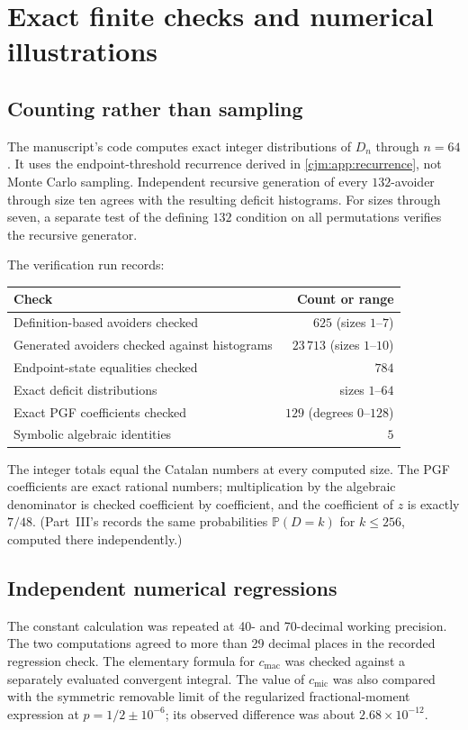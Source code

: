 \documentclass[11pt,a4paper]{article}
\theoremstyle{definition}\newaliascnt{definition}{theorem}
\theoremstyle{remark}\newaliascnt{remark}{theorem}
\newcommand{\ljP}{\mathbb P}
\newcommand{\cjmic}{c_{\mathrm{mic}}}
\newcommand{\cjmac}{c_{\mathrm{mac}}}
\begin{document}
\section{Exact finite checks and numerical illustrations}
\label{cjm:sec:computation}

\subsection{Counting rather than sampling}
The manuscript's code computes exact integer distributions of $D_n$ through
$n=64$. It uses the endpoint-threshold recurrence derived in
\cref{cjm:app:recurrence}, not Monte Carlo sampling. Independent recursive
generation of every $132$-avoider through size ten agrees with the resulting
deficit histograms. For sizes through seven, a separate test of the defining
$132$ condition on all permutations verifies the recursive generator.

The verification run records:
\begin{center}
\begin{tabular}{lr}
\toprule
Check & Count or range\\
\midrule
Definition-based avoiders checked & $625$ (sizes $1$--$7$)\\
Generated avoiders checked against histograms & $23\,713$ (sizes $1$--$10$)\\
Endpoint-state equalities checked & $784$\\
Exact deficit distributions & sizes $1$--$64$\\
Exact PGF coefficients checked & $129$ (degrees $0$--$128$)\\
Symbolic algebraic identities & $5$\\
\bottomrule
\end{tabular}
\end{center}
The integer totals equal the Catalan numbers at every computed size.
The PGF coefficients are exact rational numbers; multiplication by the
algebraic denominator is checked coefficient by coefficient, and the
coefficient of $z$ is exactly $7/48$. (Part~III's
 records the same
probabilities $\ljP(D=k)$ for $k\le256$, computed there independently.)

\subsection{Independent numerical regressions}
The constant calculation was repeated at 40- and 70-decimal working
precision. The two computations agreed to more than 29 decimal places in
the recorded regression check. The elementary formula for $\cjmac$ was
checked against a separately evaluated convergent integral. The value of
$\cjmic$ was also compared with the symmetric removable limit of the
regularized fractional-moment expression at $p=1/2\pm10^{-6}$; its observed
difference was about $2.68\times10^{-12}$.
\end{document}
